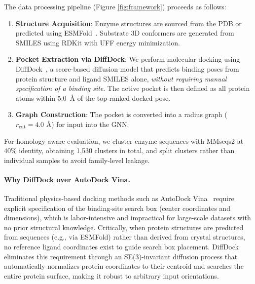 \documentclass[11pt]{article}
\begin{document}
The data processing pipeline (Figure \ref{fig:framework}) proceeds as follows:
\begin{enumerate}
    \item \textbf{Structure Acquisition}: Enzyme structures are sourced from the PDB or predicted using ESMFold~\citep{esmfold}. Substrate 3D conformers are generated from SMILES using RDKit with UFF energy minimization.
    \item \textbf{Pocket Extraction via DiffDock}: We perform molecular docking using DiffDock~\citep{diffdock2023}, a score-based diffusion model that predicts binding poses from protein structure and ligand SMILES alone, \emph{without requiring manual specification of a binding site}. The active pocket is then defined as all protein atoms within 5.0~\AA{} of the top-ranked docked pose.
    \item \textbf{Graph Construction}: The pocket is converted into a radius graph ($r_{\text{cut}} = 4.0 \text{ \AA}$) for input into the GNN.
\end{enumerate}
For homology-aware evaluation, we cluster enzyme sequences with MMseqs2 at 40\% identity, obtaining 1,530 clusters in total, and split clusters rather than individual samples to avoid family-level leakage.

\paragraph{Why DiffDock over AutoDock Vina.}
Traditional physics-based docking methods such as AutoDock Vina~\citep{trott2010autodock} require explicit specification of the binding-site search box (center coordinates and dimensions), which is labor-intensive and impractical for large-scale datasets with no prior structural knowledge. Critically, when protein structures are predicted from sequences (e.g., via ESMFold) rather than derived from crystal structures, no reference ligand coordinates exist to guide search box placement. DiffDock eliminates this requirement through an SE(3)-invariant diffusion process that automatically normalizes protein coordinates to their centroid and searches the entire protein surface, making it robust to arbitrary input orientations.
\end{document}
